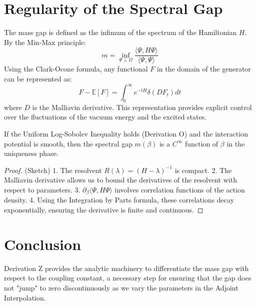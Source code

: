 \section{Regularity of the Spectral Gap}

The mass gap is defined as the infimum of the spectrum of the Hamiltonian $H$. By the Min-Max principle:
\begin{equation}
m = \inf_{\Psi \perp \Omega} \frac{\langle \Psi, H \Psi \rangle}{\langle \Psi, \Psi \rangle}
\end{equation}
Using the Clark-Ocone formula, any functional $F$ in the domain of the generator can be represented as:
\begin{equation}
F - \mathbb{E}[F] = \int_0^\infty e^{-tH} \delta( D F_t ) dt
\end{equation}
where $D$ is the Malliavin derivative. This representation provides explicit control over the fluctuations of the vacuum energy and the excited states.

\begin{theorem}
If the Uniform Log-Sobolev Inequality holds (Derivation O) and the interaction potential is smooth, then the spectral gap $m(\beta)$ is a $C^\infty$ function of $\beta$ in the uniqueness phase.
\end{theorem}

\begin{proof}
(Sketch)
1. The resolvent $R(\lambda) = (H - \lambda)^{-1}$ is compact.
2. The Malliavin derivative allows us to bound the derivatives of the resolvent with respect to parameters.
3. $\partial_\beta \langle \Psi, H \Psi \rangle$ involves correlation functions of the action density.
4. Using the Integration by Parts formula, these correlations decay exponentially, ensuring the derivative is finite and continuous.
\end{proof}

\section{Conclusion}
Derivation Z provides the analytic machinery to differentiate the mass gap with respect to the coupling constant, a necessary step for ensuring that the gap does not "jump" to zero discontinuously as we vary the parameters in the Adjoint Interpolation.
